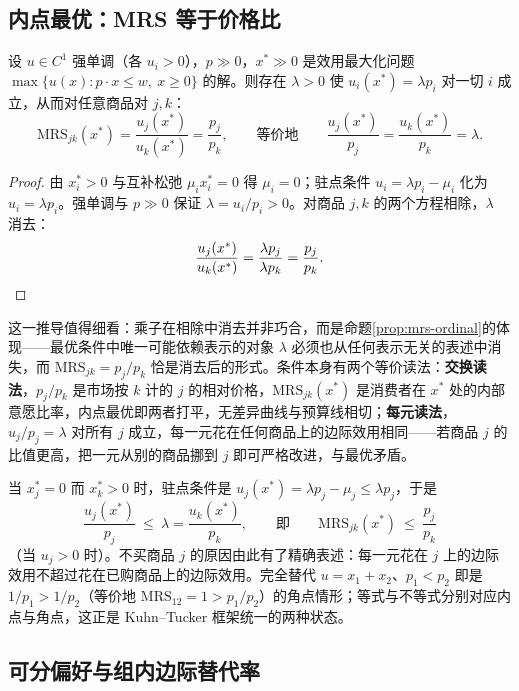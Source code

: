 \subsection{内点最优：MRS 等于价格比}
\label{sec:mrs-price}

\begin{proposition}
\label{prop:mrs-price}
设 $u\in C^1$ 强单调（各 $u_i>0$），$p\gg0$，$x^*\gg0$ 是效用最大化问题 $\max\{u(x):p\cdot x\le w,\ x\ge0\}$ 的解。则存在 $\lambda>0$ 使 $u_i(x^*)=\lambda p_i$ 对一切 $i$ 成立，从而对任意商品对 $j,k$：
\[
 \mathrm{MRS}_{jk}(x^*)=\frac{u_j(x^*)}{u_k(x^*)}=\frac{p_j}{p_k},
 \qquad\text{等价地}\qquad
 \frac{u_j(x^*)}{p_j}=\frac{u_k(x^*)}{p_k}=\lambda .
\]
\end{proposition}
\begin{proof}
由 $x_i^*>0$ 与互补松弛 $\mu_ix_i^*=0$ 得 $\mu_i=0$；驻点条件 $u_i=\lambda p_i-\mu_i$ 化为 $u_i=\lambda p_i$。强单调与 $p\gg0$ 保证 $\lambda=u_i/p_i>0$。对商品 $j,k$ 的两个方程相除，$\lambda$ 消去：
\[
 \frac{u_j(x^*)}{u_k(x^*)}=\frac{\lambda p_j}{\lambda p_k}=\frac{p_j}{p_k}. \qedhere
\]
\end{proof}

这一推导值得细看：乘子在相除中消去并非巧合，而是命题\ref{prop:mrs-ordinal}的体现——最优条件中唯一可能依赖表示的对象 $\lambda$ 必须也从任何表示无关的表述中消失，而 $\mathrm{MRS}_{jk}=p_j/p_k$ 恰是消去后的形式。条件本身有两个等价读法：\textbf{交换读法}，$p_j/p_k$ 是市场按 $k$ 计的 $j$ 的相对价格，$\mathrm{MRS}_{jk}(x^*)$ 是消费者在 $x^*$ 处的内部意愿比率，内点最优即两者打平，无差异曲线与预算线相切；\textbf{每元读法}，$u_j/p_j=\lambda$ 对所有 $j$ 成立，每一元花在任何商品上的边际效用相同——若商品 $j$ 的比值更高，把一元从别的商品挪到 $j$ 即可严格改进，与最优矛盾。

\begin{remark}
\label{rem:corner-mrs}
当 $x_j^*=0$ 而 $x_k^*>0$ 时，驻点条件是 $u_j(x^*)=\lambda p_j-\mu_j\le\lambda p_j$，于是
\[
 \frac{u_j(x^*)}{p_j}\ \le\ \lambda=\frac{u_k(x^*)}{p_k},
 \qquad\text{即}\qquad
 \mathrm{MRS}_{jk}(x^*)\ \le\ \frac{p_j}{p_k}
\]
（当 $u_j>0$ 时）。不买商品 $j$ 的原因由此有了精确表述：每一元花在 $j$ 上的边际效用不超过花在已购商品上的边际效用。完全替代 $u=x_1+x_2$、$p_1<p_2$ 即是 $1/p_1>1/p_2$（等价地 $\mathrm{MRS}_{12}=1>p_1/p_2$）的角点情形；等式与不等式分别对应内点与角点，这正是 Kuhn--Tucker 框架统一的两种状态。
\end{remark}

\subsection{可分偏好与组内边际替代率}
\label{sec:separability}

